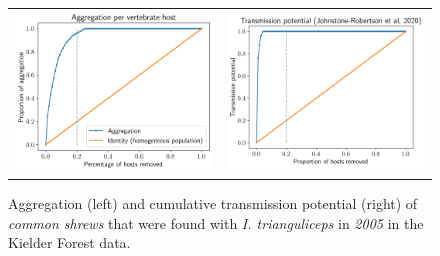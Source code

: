 \documentclass{article}
\begin{document}
\begin{figure}[]
	\begin{mdframed}[backgroundcolor=grey250,rightline=false,leftline=false,topline=false]
	\centering
	\begin{tabular}{ll}
		\includegraphics[width=.48\linewidth,valign=m]{lorenz_aggregation_SA_2005_I.Trianguliceps} & \includegraphics[width=.48\linewidth,valign=m]{lorenz_JR_SA_2005_I.Trianguliceps} \\
	\end{tabular}
	\caption{Aggregation (left) and cumulative transmission potential (right) of \textit{common shrews} that were found with \textit{I. trianguliceps} in \textit{2005} in the Kielder Forest data.}
	\label{fig:lorenz_2005_itrianguliceps_SA}
	\end{mdframed}
\end{figure}
\end{document}
